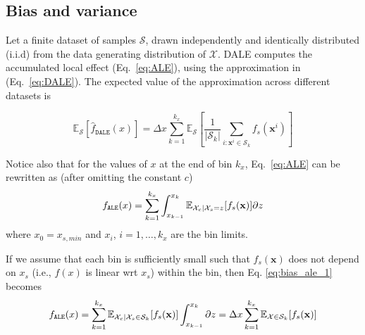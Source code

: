 \documentclass[wcp]{jmlr}
\newcommand{\dale}{\hat{f}_{\mathtt{DALE}}}
\newcommand{\xb}{\mathbf{x}} \newcommand{\R}{\mathbb{R}}
\begin{document}
\subsection{Bias and variance}
\label{sec:4-4-std} Let a finite dataset of samples \(\mathcal{S}\), drawn independently and identically distributed (i.i.d) from the data generating distribution of \(\mathcal{X}\). DALE computes the accumulated local effect (Eq.~\eqref{eq:ALE}), using the approximation in (Eq.~\eqref{eq:DALE}). The expected value of the approximation across different datasets is

\begin{equation} \mathbb{E}_{\mathcal{S}}[\dale(x)] = \Delta x\sum_{k=1}^{k_x}\mathbb{E}_{\mathcal{S}}[\frac{1}{|\mathcal{S}_k|}\sum_{i:\xb^i \in \mathcal{S}_k} f_s(\xb^i)]
  \label{eq:bias_dale}
\end{equation}

\noindent Notice also that for the values of \(x\) at the end of bin \(k_x\), Eq.~\eqref{eq:ALE} can be rewritten as (after omitting the constant \(c\))
\begin{equation} f_{\mathtt{ALE}}(x) = \sum_{k = 1}^{k_x}\int_{x_{k-1}}^{x_k} \mathbb{E}_{\Xcb|\mathcal{X}_s=z}[f_s(\xb)] \partial z
    \label{eq:bias_ale_1}
\end{equation} where \(x_0=x_{s, min}\) and \(x_i\), \(i=1, \dotsc, k_x\) are the bin limits.

\noindent If we assume that each bin is sufficiently small such that \(f_s(\xb)\) does not depend on \(x_s\) (i.e., \(f(x)\) is linear wrt \(x_s\)) within the bin, then Eq. \eqref{eq:bias_ale_1} becomes
\begin{equation} f_{\mathtt{ALE}}(x) = \sum_{k = 1}^{k_x}\mathbb{E}_{\Xcb|\mathcal{X}_s \in \mathcal{S}_k}[f_s(\xb)]\int_{x_{k-1}}^{x_k} \partial z = \Delta x\sum_{k=1}^{k_x}\mathbb{E}_{\mathcal{X} \in \mathcal{S}_k}[f_s(\xb)]
    \label{eq:bias_ale_2}
\end{equation}
\end{document}
